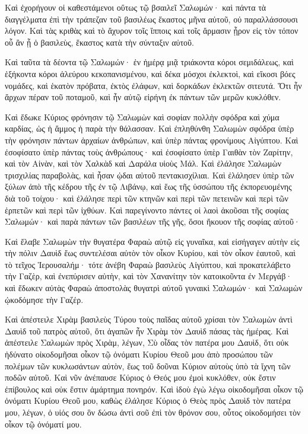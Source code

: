 {Καὶ ἐχορήγουν οἱ καθεστάμενοι οὕτως τῷ βσαιλεῖ Σαλωμών· καὶ πάντα τὰ διαγγέλματα ἐπὶ τὴν τράπεζαν τοῦ βασιλέως ἕκαστος μῆνα αὐτοῦ, οὐ παραλλάσσουσι λόγον. Καὶ τὰς κριθὰς καὶ τὸ ἄχυρον τοῖς ἵπποις καὶ τοῖς ἅρμασιν ᾖρον εἰς τὸν τόπον οὗ ἂν ᾖ ὁ βασιλεὺς, ἕκαστος κατὰ τὴν σύνταξιν αὐτοῦ.
\par }{\PP {}Καὶ ταῦτα τὰ δέοντα τῷ Σαλωμών· ἐν ἡμέρᾳ μιᾷ τριάκοντα κόροι σεμιδάλεως, καὶ ἑξήκοντα κόροι ἀλεύρου κεκοπανισμένου,
καὶ δέκα μόσχοι ἐκλεκτοὶ, καὶ εἴκοσι βόες νομάδες, καὶ ἑκατὸν πρόβατα, ἐκτὸς ἐλάφων, καὶ δορκάδων ἐκλεκτῶν σιτευτά.
Ὅτι ἦν ἄρχων πέραν τοῦ ποταμοῦ, καὶ ἦν αὐτῷ εἰρήνη ἐκ πάντων τῶν μερῶν κυκλόθεν.
\par }{\PP {}Καὶ ἔδωκε Κύριος φρόνησιν τῷ Σαλωμὼν καὶ σοφίαν πολλὴν σφόδρα καὶ χύμα καρδίας, ὡς ἡ ἄμμος ἡ παρὰ τὴν θάλασσαν.
Καὶ ἐπληθύνθη Σαλωμὼν σφόδρα ὑπὲρ τὴν φρόνησιν πάντων ἀρχαίων ἀνθρώπων, καὶ ὑπὲρ πάντας φρονίμους Αἰγύπτου.
Καὶ ἐσοφίσατο ὑπὲρ πάντας τοὺς ἀνθρώπους· καὶ ἐσοφίσατο ὑπὲρ Γαιθὰν τὸν Ζαρίτην, καὶ τὸν Αἰνὰν, καὶ τὸν Χαλκὰδ καὶ Δαράλα υἱοὺς Μάλ.
Καὶ ἐλάλησε Σαλωμὼν τρισχιλίας παραβολὰς, καὶ ἦσαν ᾠδαι αὐτοῦ πεντακισχίλιαι.
Καὶ ἐλάλησεν ὑπὲρ τῶν ξύλων ἀπὸ τῆς κέδρου τῆς ἐν τῷ Λιβάνῳ, καὶ ἕως τῆς ὑσσώπου τῆς ἐκπορευομένης διὰ τοῦ τοίχου· καὶ ἐλάλησε περὶ τῶν κτηνῶν καὶ περὶ τῶν πετεινῶν καὶ περὶ τῶν ἑρπετῶν καὶ περὶ τῶν ἰχθύων.
Καὶ παρεγίνοντο πάντες οἱ λαοὶ ἀκοῦσαι τῆς σοφίας Σαλωμών· καὶ παρὰ πάντων τῶν βασιλέων τῆς γῆς, ὅσοι ἤκουον τῆς σοφίας αὐτοῦ·
\par }{\PP {}Καὶ ἔλαβε Σαλωμὼν τὴν θυγατέρα Φαραὼ αὐτῷ εἰς γυναῖκα, καὶ εἰσήγαγεν αὐτὴν εἰς τὴν πόλιν Δαυὶδ ἕως συντελέσαι αὐτὸν τὸν οἶκον Κυρίου, καὶ τὸν οἶκον ἑαυτοῦ, καὶ τὸ τεῖχος Ἱερουσαλήμ·
τότε ἀνέβη Φαραὼ βασιλεὺς Αἰγύπτου, καὶ προκατελάβετο τὴν Γαζὲρ, καὶ ἐνεπύρισεν αὐτὴν, καὶ τὸν Χανανίτην τὸν κατοικοῦντα ἐν Μεργάβ· καὶ ἔδωκεν αὐτὰς Φαραὼ ἀποστολὰς θυγατρὶ αὐτοῦ γυναικὶ Σαλωμών· καὶ Σαλωμὼν ᾠκοδόμησε τὴν Γαζέρ.
\par }{\PP {}Καὶ ἀπέστειλε Χιρὰμ βασιλεὺς Τύρου τοὺς παῖδας αὐτοῦ χρίσαι τὸν Σαλωμὼν ἀντὶ Δαυὶδ τοῦ πατρὸς αὐτοῦ, ὅτι ἀγαπῶν ἦν Χιρὰμ τὸν Δαυὶδ πάσας τὰς ἡμέρας.
Καὶ ἀπέστειλε Σαλωμὼν πρὸς Χιρὰμ, λέγων,
Σὺ οἶδας τὸν πατέρα μου Δαυὶδ, ὅτι οὐκ ἠδύνατο οἰκοδομῆσαι οἶκον τῷ ὀνόματι Κυρίου Θεοῦ μου ἀπὸ προσώπου τῶν πολέμων τῶν κυκλωσάντων αὐτὸν, ἕως τοῦ δοῦναι Κύριον αὐτοὺς ὑπὸ τὰ ἴχνη τῶν ποδῶν αὐτοῦ.
Καὶ νῦν ἀνέπαυσε Κύριος ὁ Θεός μου ἐμοὶ κυκλόθεν, οὐκ ἔστιν ἐπίβουλος καὶ οὐκ ἔστιν ἁμάρτημα πονηρόν.
Καὶ ἰδοὺ ἐγὼ λέγω οἰκοδομῆσαι οἶκον τῷ ὀνόματι Κυρίου Θεοῦ μου, καθὼς ἐλάλησε Κύριος ὁ Θεὸς πρὸς Δαυὶδ τὸν πατέρα μου, λέγων, ὁ υἱός σου ὃν δώσω ἀντὶ σοῦ ἐπὶ τὸν θρόνον σου, οὗτος οἰκοδομήσει τὸν οἶκον τῷ ὀνόματί μου.
}
